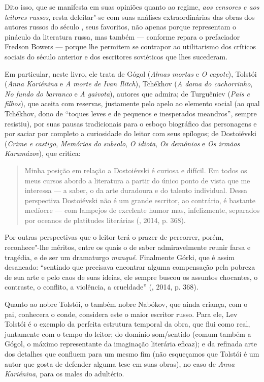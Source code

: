 Dito isso, que se manifesta em suas opiniões quanto ao regime, \emph{aos
censores e aos leitores russos}, resta deleitar"-se com suas análises
extraordinárias das obras dos autores russos do século , seus
favoritos, não apenas porque representam o pináculo da literatura russa,
mas também --- conforme repara o prefaciador Fredson Bowers --- porque
lhe permitem se contrapor ao utilitarismo dos críticos sociais do século
anterior e dos escritores soviéticos que lhes sucederam.

Em particular, neste livro, ele trata de Gógol (\emph{Almas mortas} e
\emph{O capote}), Tolstói (\emph{Anna Kariénina} e \emph{A morte de Ivan
Ilitch}), Tchékhov (\emph{A dama do cachorrinho}, \emph{No fundo do
barranco} e \emph{A gaivota}), autores que admira; de Turguêniev
(\emph{Pais e filhos}), que aceita com reservas, justamente pelo apelo
ao elemento social (ao qual Tchékhov, dono de ``toques leves e de
pequenos e inesperados meandros'', sempre resistiu), por suas pausas
tradicionais para o esboço biográfico das personagens e por saciar por
completo a curiosidade do leitor com seus epílogos; de Dostoiévski
(\emph{Crime e castigo}, \emph{Memórias do subsolo}, \emph{O idiota},
\emph{Os demônios} e \emph{Os irmãos Karamázov}), que critica:

\begin{quotation}
Minha posição em relação a Dostoiévski é curiosa e difícil. Em todos os meus
cursos abordo a literatura a partir do único ponto de vista que me
interessa --- a saber, o da arte duradoura e do talento individual. Dessa
perspectiva Dostoiévski não é um grande escritor, ao contrário, é
bastante medíocre --- com lampejos de excelente humor mas, infelizmente,
separados por oceanos de platitudes literárias (, 2014, p. 368).
\end{quotation}

Por outras perspectivas que o leitor terá o prazer de percorrer, porém,
reconhece"-lhe méritos, entre os quais o de saber admiravelmente reunir
farsa e tragédia, e de ser um dramaturgo \emph{manqué}. Finalmente
Górki, que é assim desancado: ``sentindo que precisava encontrar alguma
compensação pela pobreza de sua arte e pelo caos de suas ideias, ele
sempre buscou os assuntos chocantes, o contraste, o conflito, a
violência, a crueldade'' (, 2014, p. 368).

Quanto ao nobre Tolstói, o também nobre Nabókov, que ainda criança,
com o pai, conhecera o conde, considera este o maior escritor
russo. Para ele, Lev Tolstói é o exemplo da perfeita estrutura temporal da obra, que
flui como real, juntamente com o tempo do leitor; do domínio som/sentido
(comum também a Gógol, o máximo representante da imaginação literária
eficaz); e da refinada arte dos detalhes que confluem para um mesmo fim (não
esqueçamos que Tolstói é um autor que gosta de defender alguma tese em suas
obras), no caso de \emph{Anna Kariénina}, para os males do adultério.


